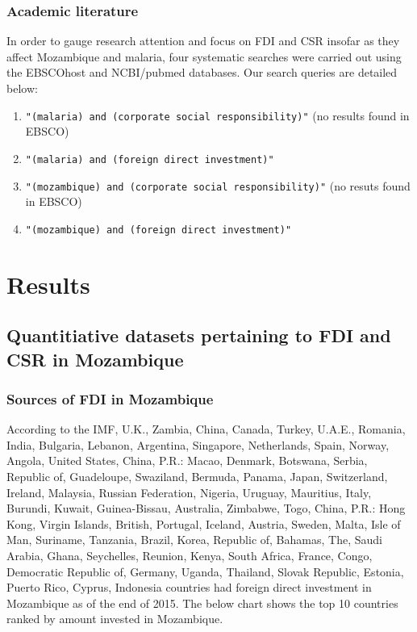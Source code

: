 \documentclass[]{elsarticle} %
\providecommand{\tightlist}{%
  \setlength{\itemsep}{0pt}\setlength{\parskip}{0pt}}
\begin{document}
\subsubsection{Academic literature}\label{academic-literature}

In order to gauge research attention and focus on FDI and CSR insofar as
they affect Mozambique and malaria, four systematic searches were
carried out using the EBSCOhost and NCBI/pubmed databases. Our search
queries are detailed below:

\begin{enumerate}
\def\labelenumi{\arabic{enumi}.}
\tightlist
\item
  \texttt{"(malaria)\ and\ (corporate\ social\ responsibility)"} (no
  results found in EBSCO)
\item
  \texttt{"(malaria)\ and\ (foreign\ direct\ investment)"}
\item
  \texttt{"(mozambique)\ and\ (corporate\ social\ responsibility)"} (no
  resuts found in EBSCO)
\item
  \texttt{"(mozambique)\ and\ (foreign\ direct\ investment)"}
\end{enumerate}

\section{Results}\label{results}

\subsection{Quantitiative datasets pertaining to FDI and CSR in
Mozambique}\label{quantitiative-datasets-pertaining-to-fdi-and-csr-in-mozambique}

\subsubsection{Sources of FDI in
Mozambique}\label{sources-of-fdi-in-mozambique}

According to the IMF, U.K., Zambia, China, Canada, Turkey, U.A.E.,
Romania, India, Bulgaria, Lebanon, Argentina, Singapore, Netherlands,
Spain, Norway, Angola, United States, China, P.R.: Macao, Denmark,
Botswana, Serbia, Republic of, Guadeloupe, Swaziland, Bermuda, Panama,
Japan, Switzerland, Ireland, Malaysia, Russian Federation, Nigeria,
Uruguay, Mauritius, Italy, Burundi, Kuwait, Guinea-Bissau, Australia,
Zimbabwe, Togo, China, P.R.: Hong Kong, Virgin Islands, British,
Portugal, Iceland, Austria, Sweden, Malta, Isle of Man, Suriname,
Tanzania, Brazil, Korea, Republic of, Bahamas, The, Saudi Arabia, Ghana,
Seychelles, Reunion, Kenya, South Africa, France, Congo, Democratic
Republic of, Germany, Uganda, Thailand, Slovak Republic, Estonia, Puerto
Rico, Cyprus, Indonesia countries had foreign direct investment in
Mozambique as of the end of 2015. The below chart shows the top 10
countries ranked by amount invested in Mozambique.
\end{document}
